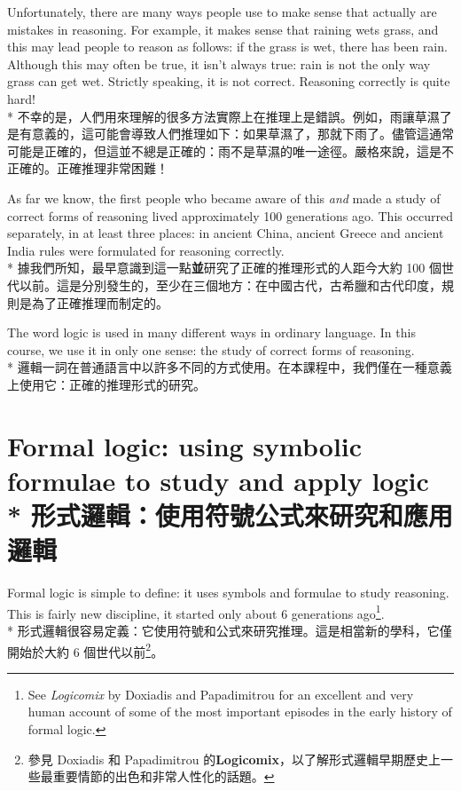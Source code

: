 \documentclass[]{article}
\begin{document}
{\color{gray}Unfortunately, there are many ways people use to make sense that actually are mistakes in reasoning. For example, it makes sense that raining wets grass, and this may lead people to reason as follows: if the grass is wet, there has been rain. Although this may often be true, it isn't always true: rain is not the only way grass can get wet. Strictly speaking, it is not correct. Reasoning correctly is quite hard!}
\\*
{不幸的是，人們用來理解的很多方法實際上在推理上是錯誤。例如，雨讓草濕了是有意義的，這可能會導致人們推理如下：如果草濕了，那就下雨了。儘管這通常可能是正確的，但這並不總是正確的：雨不是草濕的唯一途徑。嚴格來說，這是不正確的。正確推理非常困難！}

{\color{gray}As far we know, the first people who became aware of this \emph{and} made a study of correct forms of reasoning lived approximately 100 generations ago. This occurred separately, in at least three places: in ancient China, ancient Greece and ancient India rules were formulated for reasoning correctly.}
\\*
{據我們所知，最早意識到這一點{\bfseries{並}}研究了正確的推理形式的人距今大約 100 個世代以前。這是分別發生的，至少在三個地方：在中國古代，古希臘和古代印度，規則是為了正確推理而制定的。}

{\color{gray}The word logic is used in many different ways in ordinary language. In this course, we use it in only one sense: the study of correct forms of reasoning.}
\\*
{邏輯一詞在普通語言中以許多不同的方式使用。在本課程中，我們僅在一種意義上使用它：正確的推理形式的研究。}

\section*{{\color{gray}Formal logic: using symbolic formulae to study and apply logic}
\\*
{形式邏輯：使用符號公式來研究和應用邏輯}}

{\color{gray}Formal logic is simple to define: it uses symbols and formulae to study reasoning. This is fairly new discipline, it started only about 6 generations ago\footnote{See \emph{Logicomix} by Doxiadis and Papadimitrou for an excellent and very human account of some of the most important episodes in the early history of formal logic.}.}
\\*
{形式邏輯很容易定義：它使用符號和公式來研究推理。這是相當新的學科，它僅開始於大約 6 個世代以前\footnote{參見{ }Doxiadis{ }和{ }Papadimitrou{ }的{\bfseries{Logicomix}}，以了解形式邏輯早期歷史上一些最重要情節的出色和非常人性化的話題。}。}
\end{document}
